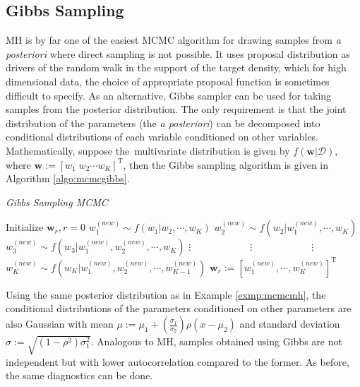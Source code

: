 \subsection{Gibbs Sampling}\label{sec:gibbssampling}
MH is by far one of the easiest MCMC algorithm for drawing samples from \textit{a posteriori} where direct sampling is not possible. It uses proposal distribution as drivers of the random walk in the support of the target density, which for high dimensional data, the choice of appropriate proposal function is sometimes difficult to specify. As an alternative, Gibbs sampler can be used for taking samples from the posterior distribution. The only requirement is that the joint distribution of the parameters (the \textit{a posteriori}) can be decomposed into conditional distributions of each variable conditioned on other variables. Mathematically, suppose \mbox{the multivariate} distribution is given by $f(\mathbf{w}|\mathscr{D})$, where $\mathbf{w}:=[w_1\;w_2\cdots w_K]^{\text{T}}$, then the Gibbs sampling algorithm is given in Algorithm \ref{algo:mcmcgibbs}.
\vspace{.4cm}

\begin{algorithm}[!b]
\caption{\it Gibbs Sampling MCMC}
\label{algo:mcmcgibbs}
\begin{algorithmic}[1]\vspace{.2cm}
\item Initialize $\mathbf{w}_{r}, r=0$\vspace{.2cm}
\vspace{.2cm}
\State $w_1^{(new)}\sim f(w_1|w_2,\cdots,w_K)$\vspace{.2cm}
\State $w_2^{(new)}\sim f(w_2|w_1^{(new)},\cdots,w_K)$\vspace{.2cm}
\State $w_3^{(new)}\sim f(w_3|w_1^{(new)},w_2^{(new)},\cdots,w_K)$\vspace{.2cm}
\State $\vdots\qquad\qquad\qquad\vdots\qquad\qquad\qquad\vdots$\vspace{.2cm}
\State $w_K^{(new)}\sim f(w_K|w_1^{(new)},w_2^{(new)},\cdots,w_{K-1}^{(new)})$\vspace{.2cm}
\State $\mathbf{w}_r:=[w_1^{(new)},\cdots,w_K^{(new)}]^{\text{T}}$\vspace{.2cm}
\EndFor
\end{algorithmic}
\end{algorithm}
\vspace{-.3cm}
\begin{exmp}\label{exmp:gibbs}
Using the same posterior distribution as in Example \ref{exmp:mcmcmh}, the conditional distributions of the parameters conditioned on other parameters are also Gaussian with mean $\mu:=\mu_1 + \left(\frac{\sigma_1}{\sigma_2}\right)\rho(x - \mu_2)$ and standard deviation $\sigma:=\sqrt{(1 - \rho^2)\sigma_1^2}$. Analogous to MH, samples obtained using Gibbs are not independent but with lower autocorrelation compared to the former. As before, the same diagnostics can be done. 
\end{exmp}

